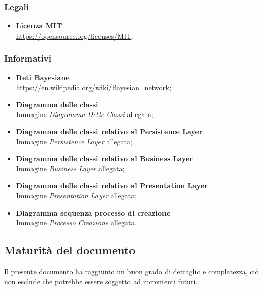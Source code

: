\subsubsection{Legali}
\begin{itemize}
	\item{\textbf{Licenza MIT}\\
		\url{https://opensource.org/licenses/MIT}}.
\end{itemize}
\subsubsection{Informativi}
\begin{itemize}
	\item{\textbf{Reti Bayesiane}\\
			\url{https://en.wikipedia.org/wiki/Bayesian_network};}
	\item{\textbf{Diagramma delle classi}\\
		Immagine \emph{Diagramma Delle Classi} allegata;}
	\item{\textbf{Diagramma delle classi relativo al Persistence Layer}\\
		Immagine \emph{Persistence Layer} allegata;}
	\item{\textbf{Diagramma delle classi relativo al Business Layer}\\
		Immagine \emph{Business Layer} allegata;}
	\item{\textbf{Diagramma delle classi relativo al Presentation Layer}\\
		Immagine \emph{Presentation Layer} allegata;}
	\item{\textbf{Diagramma sequenza processo di creazione}\\
		Immagine \emph{Processo Creazione} allegata.}
\end{itemize}

\subsection{Maturità del documento}
Il presente documento ha raggiunto un buon grado di dettaglio e completezza, ciò non esclude
che potrebbe essere soggetto ad incrementi futuri.
\pagebreak
